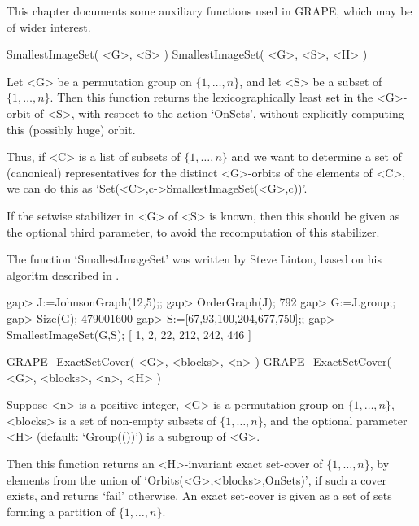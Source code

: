 %
%
%
%
\def\GRAPE{\sf GRAPE}
\def\nauty{\it nauty}
\def\G{\Gamma}
\def\Aut{{\rm Aut}\,}
\def\x{\times}

This chapter documents some auxiliary functions used in {\GRAPE},
which may be of wider interest. 


\>SmallestImageSet( <G>, <S> )
\>SmallestImageSet( <G>, <S>, <H> )

Let <G> be a permutation group on $\{1,\ldots,n\}$, and let <S>
be a subset of $\{1,\ldots,n\}$. Then this function returns the
lexicographically least set in the <G>-orbit of <S>, with respect to the
action `OnSets', without explicitly computing this (possibly huge) orbit.

Thus, if <C> is a list of subsets of $\{1,\ldots,n\}$ and we
want to determine a set of (canonical) representatives for the
distinct <G>-orbits of the elements of <C>, we can do this as
`Set(<C>,c->SmallestImageSet(<G>,c))'.

If the setwise stabilizer in <G> of <S> is known, then this should be
given as the optional third parameter, to avoid the recomputation of
this stabilizer.

The function `SmallestImageSet' was written by Steve Linton, based
on his algoritm described in \cite{Lin04}. 

\beginexample
gap> J:=JohnsonGraph(12,5);;
gap> OrderGraph(J);
792
gap> G:=J.group;;
gap> Size(G);
479001600
gap> S:=[67,93,100,204,677,750];;
gap> SmallestImageSet(G,S);
[ 1, 2, 22, 212, 242, 446 ]
\endexample


\>GRAPE_ExactSetCover( <G>, <blocks>, <n> )
\>GRAPE_ExactSetCover( <G>, <blocks>, <n>, <H> )

Suppose <n> is a positive integer, <G> is a permutation group
on $\{1,\ldots,n\}$, <blocks> is a set of non-empty subsets
of $\{1,\ldots,n\}$, and the optional parameter <H> (default:
`Group(())') is a subgroup of <G>. 

Then this function returns an <H>-invariant exact 
set-cover of $\{1,\ldots,n\}$, by elements from the union of
`Orbits(<G>,<blocks>,OnSets)', if such a cover exists,
and returns  `fail'  otherwise. An exact set-cover is given as a set of
sets forming a partition of $\{1,\ldots,n\}$.

